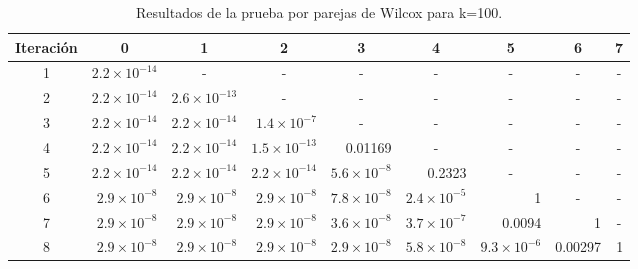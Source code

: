 \documentclass{article}
\begin{document}
\begin{table}[h!]
\centering
\caption{Resultados de la prueba por parejas de Wilcox para k=100.}
\label{tabla9}
\begin{tabular}{|c|r|r|r|r|c|c|c|c|}
\hline
Iteración & \multicolumn{1}{c|}{\textbf{0}} & \multicolumn{1}{c|}{\textbf{1}} & \multicolumn{1}{c|}{\textbf{2}} & \multicolumn{1}{c|}{\textbf{3}} & \textbf{4} & 5 & 6 & 7 \\ \hline
1 & $2.2\times 10^{-14}$ & \multicolumn{1}{c|}{-} & \multicolumn{1}{c|}{-} & \multicolumn{1}{c|}{-} & - & - & - & - \\ \hline
2 & $2.2\times 10^{-14}$ & $2.6\times 10^{-13}$ & \multicolumn{1}{c|}{-} & \multicolumn{1}{c|}{-} & - & - & - & - \\ \hline
3 & $2.2\times 10^{-14}$ & $2.2\times 10^{-14}$ & $1.4\times 10^{-7}$ & \multicolumn{1}{c|}{-} & - & - & - & - \\ \hline
4 & $2.2\times 10^{-14}$ & $2.2\times 10^{-14}$ & $1.5\times 10^{-13}$ & 0.01169 & - & - & - & - \\ \hline
5 & $2.2\times 10^{-14}$ & $2.2\times 10^{-14}$ & $2.2\times 10^{-14}$ & $5.6\times 10^{-8}$ & \multicolumn{1}{r|}{0.2323} & - & - & - \\ \hline
6 & $2.9\times 10^{-8}$ & $2.9\times 10^{-8}$ & $2.9\times 10^{-8}$ & $7.8\times 10^{-8}$ & \multicolumn{1}{r|}{$2.4\times 10^{-5}$} & \multicolumn{1}{r|}{1} & - & - \\ \hline
7 & $2.9\times 10^{-8}$ & $2.9\times 10^{-8}$ & $2.9\times 10^{-8}$ & $3.6\times 10^{-8}$ & \multicolumn{1}{r|}{$3.7\times 10^{-7}$} & \multicolumn{1}{r|}{0.0094} & \multicolumn{1}{r|}{1} & - \\ \hline
8 & $2.9\times 10^{-8}$ & $2.9\times 10^{-8}$ & $2.9\times 10^{-8}$ & $2.9\times 10^{-8}$ & \multicolumn{1}{r|}{$5.8\times 10^{-8}$} & \multicolumn{1}{r|}{$9.3\times 10^{-6}$} & \multicolumn{1}{r|}{0.00297} & \multicolumn{1}{r|}{1} \\ \hline
\end{tabular}
\end{table}
\end{document}
